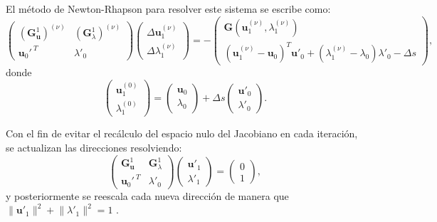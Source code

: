 El método de Newton-Rhapson para resolver este sistema se escribe como:
\begin{equation}
    \begin{pmatrix}
        \left(\mathbf{G}_{\mathbf{u}}^1\right)^{(\nu)} & \left(\mathbf{G}_{\lambda}^1\right)^{(\nu)} \\[6pt]
        \mathbf{u}_0'^{\ T}                            & \lambda'_0
    \end{pmatrix}
    \begin{pmatrix}
        \Delta \mathbf{u}_1^{(\nu)} \\[6pt]
        \Delta \lambda_1^{(\nu)}
    \end{pmatrix}
    = -
    \begin{pmatrix}
        \mathbf{G}(\mathbf{u}_1^{(\nu)}, \lambda_1^{(\nu)}) \\[6pt]
        (\mathbf{u}_1^{(\nu)} - \mathbf{u}_0)^T \mathbf{u}'_0 +
        (\lambda_1^{(\nu)} - \lambda_0) \lambda'_0
        - \Delta s
    \end{pmatrix},
    \label{eq:NR_PALC}
\end{equation}
donde
\begin{equation}
    \begin{pmatrix}
        \mathbf{u}_1^{(0)} \\[6pt]
        \lambda_1^{(0)}
    \end{pmatrix} =
    \begin{pmatrix}
        \mathbf{u}_0 \\[6pt]
        \lambda_0
    \end{pmatrix}
    + \Delta s
    \begin{pmatrix}
        \mathbf{u}'_0 \\[6pt]
        \lambda'_0
    \end{pmatrix}.
    \label{eq:first_step_PALC}
\end{equation}


Con el fin de evitar el recálculo del espacio nulo del Jacobiano en cada iteración,
se actualizan las direcciones resolviendo:
\begin{equation}
    \begin{pmatrix}
        \mathbf{G}_{\mathbf{u}}^1 & \mathbf{G}_{\lambda}^1 \\[6pt]
        \mathbf{u}_0'^{\ T}       & \lambda'_0
    \end{pmatrix}
    \begin{pmatrix}
        \mathbf{u}'_1 \\[6pt]
        \lambda'_1
    \end{pmatrix}
    =
    \begin{pmatrix}
        0 \\[6pt] 1
    \end{pmatrix},
    \label{eq:new_directions}
\end{equation}
y posteriormente se reescala cada nueva dirección de manera que
$ \lVert \mathbf{u}'_1 \rVert^2 + \lVert \lambda'_1 \rVert^2 = 1 $ \cite{Doedel2007}.


